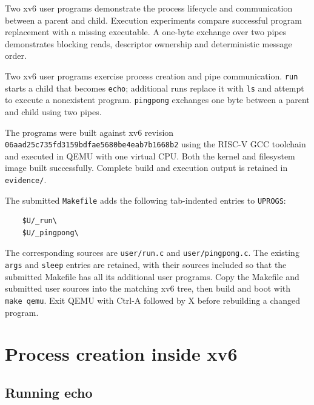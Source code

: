 \documentclass{../latex/utmreport}
\begin{document}
\makeutmreporttitlepage
\tableofcontents
\clearpage
\begin{utmabstract}[Abstract]
Two xv6 user programs demonstrate the process lifecycle and communication between a parent and child. Execution experiments compare successful program replacement with a missing executable. A one-byte exchange over two pipes demonstrates blocking reads, descriptor ownership and deterministic message order.
\end{utmabstract}
\utmintroduction

Two xv6 user programs exercise process creation and pipe communication.
\texttt{run} starts a child that becomes \texttt{echo}; additional runs
replace it with \texttt{ls} and attempt to execute a nonexistent
program. \texttt{pingpong} exchanges one byte between a parent and child
using two pipes.

The programs were built against xv6 revision
\texttt{06aad25c735fd3159bdfae5680be4eab7b1668b2} using the RISC-V GCC
toolchain and executed in QEMU with one virtual CPU. Both the kernel and
filesystem image built successfully. Complete build and execution output
is retained in \texttt{evidence/}.

The submitted \texttt{Makefile} adds the following tab-indented entries
to \texttt{UPROGS}:

\begin{lstlisting}
    $U/_run\
    $U/_pingpong\
\end{lstlisting}

The corresponding sources are \texttt{user/run.c} and
\texttt{user/pingpong.c}. The existing \texttt{args} and \texttt{sleep}
entries are retained, with their sources included so that the submitted
Makefile has all its additional user programs. Copy the Makefile and
submitted user sources into the matching xv6 tree, then build and boot
with \texttt{make\ qemu}. Exit QEMU with Ctrl-A followed by X before
rebuilding a changed program.

\chapter{Process creation inside xv6}\label{process-creation-inside-xv6}

\section{Running echo}\label{running-echo}
\end{document}
